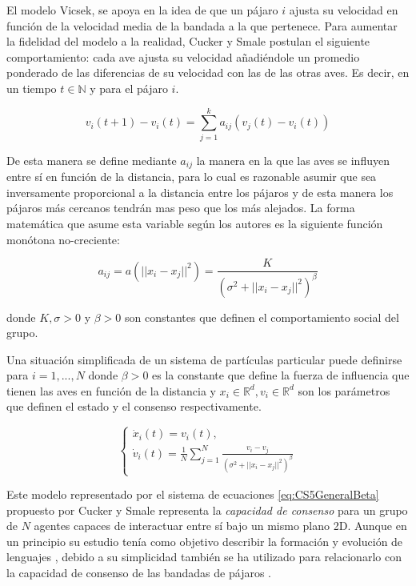 El modelo Vicsek, se apoya en la idea de que un pájaro $i$ ajusta su velocidad en función de la velocidad media de la bandada a la que pertenece. Para aumentar la fidelidad del modelo a la realidad, Cucker y Smale postulan el siguiente comportamiento: cada ave ajusta su velocidad añadiéndole un promedio ponderado de las diferencias de su velocidad con las de las otras aves. Es decir, en un tiempo $t \in \mathbb N$  y para el pájaro $i$.

\begin{equation}\label{eq:CS1}
    v_{i}(t+1)-v_i(t)=\sum_{j=1}^{k} a_{ij}(v_{j}(t)-v_{i}(t))
\end{equation}

De esta manera se define mediante $a_{ij}$ la manera en la que las aves se influyen entre sí en función de la distancia, para lo cual es razonable asumir que sea inversamente proporcional a la distancia entre los pájaros y de esta manera los pájaros más cercanos tendrán mas peso que los más alejados. La forma matemática que asume esta variable según los autores es la siguiente función monótona no-creciente:

\begin{equation}\label{eq:CS2-aij}
    a_{ij} = a(||x_{i}-x_{j}||^2) = \frac{K}{(\sigma^2 +||x_{i}-x_{j}||^2)^\beta}
\end{equation}

\noindent donde $K,\sigma>0$ y $\beta>0$ son constantes que definen el comportamiento social del grupo. 

Una situación simplificada de un sistema de partículas particular puede definirse para $i = 1,...,N$ donde $\beta > 0$ es la constante que define la fuerza de influencia que tienen las aves en función de la distancia y $x_i \in \mathbb{R}^d, v_i \in \mathbb{R}^d$ son los parámetros que definen el estado y el consenso respectivamente. 

\begin{equation}\label{eq:CS5GeneralBeta} 
    \left\lbrace
    \begin{array}{ll}
        \dot{x}_{i}(t)=v_{i}(t) ,\\
        \dot{v}_{i}(t)= \displaystyle{\frac{1}{N}\sum_{j=1}^{N}\frac{v_{i}-v_{j}}{(\sigma^2+||x_{i}-x_{j}||^2)^\beta}}
    \end{array}
    \right.
\end{equation}

Este modelo representado por el sistema de ecuaciones \ref{eq:CS5GeneralBeta} propuesto por Cucker y Smale representa la \textit{capacidad de consenso} para un grupo de $N$ agentes capaces de interactuar entre sí bajo un mismo plano 2D. Aunque en un principio su estudio tenía como objetivo describir la formación y evolución de lenguajes \cite{cucker2007emergent}, debido a su simplicidad también se ha utilizado para relacionarlo con la capacidad de consenso de las bandadas de pájaros \cite{cucker2007mathematics}. 

